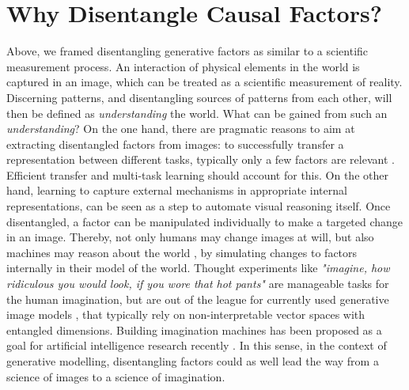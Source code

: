 \section{Why Disentangle Causal Factors?}
	Above, we framed disentangling generative factors as similar to a scientific measurement process. An interaction of physical elements in the world is captured in an image, which can be treated as a scientific measurement of reality. Discerning patterns, and disentangling sources of patterns from each other, will then be defined as \textit{understanding} the world. What can be gained from such an \textit{understanding}?
	On the one hand, there are pragmatic reasons to aim at extracting disentangled factors from images: to successfully transfer a representation between different tasks, typically only a few factors are relevant \cite{bengio13rep}.
	Efficient transfer and multi-task learning should account for this.
	On the other hand, learning to capture external mechanisms in appropriate internal representations, can be seen as a step to automate visual reasoning itself.
	Once disentangled, a factor can be manipulated individually to make a targeted change in an image. Thereby, not only humans may change images at will, but also machines may reason about the world \cite{pearl18impediments}, by simulating changes to factors internally in their model of the world.
	Thought experiments like \textit{"imagine, how ridiculous you would look, if you wore that hot pants"} are manageable tasks for the human imagination, but are out of the league for currently used generative image models \cite{goodfellow14gan, kingma13vae}, that typically rely on non-interpretable vector spaces with entangled dimensions.
	Building imagination machines has been proposed as a goal for artificial intelligence research recently \cite{mahadevan18imagine}.
	In this sense, in the context of generative modelling, disentangling factors could as well lead the way from a science of images to a science of imagination.


